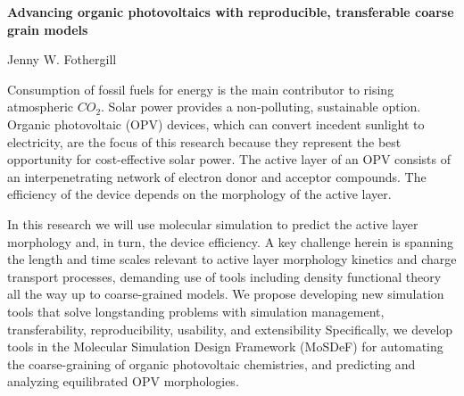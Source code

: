 \documentclass{article}
\begin{document}
\begin{center}
    \large{\textbf{Advancing organic photovoltaics with reproducible, transferable coarse grain models}}
\end{center}
\begin{center}
    Jenny W. Fothergill
\end{center}

Consumption of fossil fuels for energy is the main contributor to rising atmospheric $CO_{2}$. 
Solar power provides a non-polluting, sustainable option.
Organic photovoltaic (OPV) devices, which can convert incedent sunlight to electricity, are the focus of this research because they represent the best opportunity for cost-effective solar power.
The active layer of an OPV consists of an interpenetrating network of electron donor and acceptor compounds.
The efficiency of the device depends on the morphology of the active layer.

In this research we will use molecular simulation to predict the active layer morphology and, in turn, the device efficiency.
A key challenge herein is spanning the length and time scales relevant to active layer morphology kinetics and charge transport processes, demanding use of tools including density functional theory all the way up to coarse-grained models.
We propose developing new simulation tools that solve longstanding problems with simulation management, transferability, reproducibility, usability, and extensibility
Specifically, we develop tools in the Molecular Simulation Design Framework (MoSDeF) for automating the coarse-graining of organic photovoltaic chemistries, and predicting and analyzing equilibrated OPV morphologies.
\end{document}

